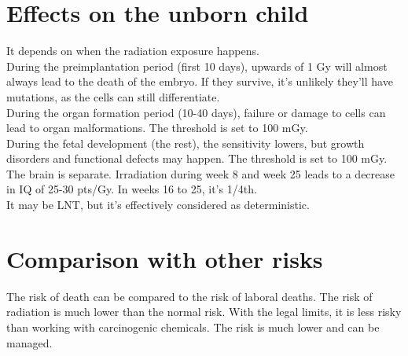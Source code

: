 \section{Effects on the unborn child}
It depends on when the radiation exposure happens.\\
During the preimplantation period (first 10 days), upwards of 1 Gy will almost always lead to the death of the embryo. If they survive, it's unlikely they'll have mutations, as the cells can still differentiate.\\
During the organ formation period (10-40 days), failure or damage to cells can lead to organ malformations. The threshold is set to 100 mGy.\\
During the fetal development (the rest), the sensitivity lowers, but growth disorders and functional defects may happen. The threshold is set to 100 mGy.\\
The brain is separate. Irradiation during week 8 and week 25 leads to a decrease in IQ of 25-30 pts/Gy. In weeks 16 to 25, it's 1/4th.\\
It may be LNT, but it's effectively considered as deterministic.
\section{Comparison with other risks}
The risk of death can be compared to the risk of laboral deaths. The risk of radiation is much lower than the normal risk. With the legal limits, it is less risky than working with carcinogenic chemicals. The risk is much lower and can be managed.